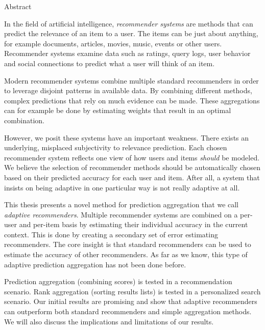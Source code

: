 \null\vspace{4em}
{
  \centering
  \normalfont
  \huge
  \noindent
  Abstract\\
}
\vspace{2em}

\noindent
In the field of artificial intelligence,
\emph{recommender systems} are methods
that can predict the relevance of an item to a user.
The items can be just about anything, for example 
documents, articles, movies, music, events or other users.
Recommender systems examine data such as ratings, query logs,
user behavior and social connections to predict
what a user will think of an item.

Modern recommender systems
combine multiple standard recommenders
in order to leverage disjoint patterns in available data.
By combining different methods,
complex predictions that rely on much evidence can be made.
These aggregations can for example be done 
by estimating weights that result in an optimal combination.

However, we posit these systems have an important weakness.
There exists an underlying, misplaced subjectivity to relevance prediction.
Each chosen recommender system reflects one view of 
how users and items \emph{should} be modeled.
We believe the selection of recommender methods should 
be automatically chosen based on their predicted accuracy for each user and item.
After all, a system that insists on being adaptive
in one particular way is not really adaptive at all.

This thesis presents a novel method for prediction aggregation
that we call \emph{adaptive recommenders}.
Multiple recommender systems are combined on a per-user and per-item basis
by estimating their individual accuracy in the current context.
This is done by creating a secondary set of error estimating recommenders.
The core insight is that standard recommenders can be used
to estimate the accuracy of other recommenders.
As far as we know, this type of adaptive prediction aggregation
has not been done before.

Prediction aggregation (combining scores) is tested in a recommendation scenario.
Rank aggregation (sorting results lists) is tested in a personalized search scenario.
Our initial results are promising and show that adaptive recommenders
can outperform both standard recommenders and simple aggregation methods.
We will also discuss the implications and limitations of our results.

\cleardoublepage
